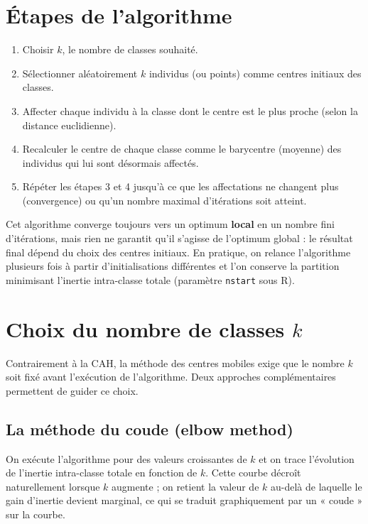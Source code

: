 \documentclass[11pt,a4paper]{report}
\begin{document}
	\section{Étapes de l'algorithme}
	
	\begin{enumerate}
		\item Choisir $k$, le nombre de classes souhaité.
		\item Sélectionner aléatoirement $k$ individus (ou points) comme centres initiaux des classes.
		\item Affecter chaque individu à la classe dont le centre est le plus proche (selon la distance euclidienne).
		\item Recalculer le centre de chaque classe comme le barycentre (moyenne) des individus qui lui sont désormais affectés.
		\item Répéter les étapes 3 et 4 jusqu'à ce que les affectations ne changent plus (convergence) ou qu'un nombre maximal d'itérations soit atteint.
	\end{enumerate}
	
	\begin{retenir}
		Cet algorithme converge toujours vers un optimum \textbf{local} en un nombre fini d'itérations, mais rien ne garantit qu'il s'agisse de l'optimum global : le résultat final dépend du choix des centres initiaux. En pratique, on relance l'algorithme plusieurs fois à partir d'initialisations différentes et l'on conserve la partition minimisant l'inertie intra-classe totale (paramètre \texttt{nstart} sous R).
	\end{retenir}
	
	\section{Choix du nombre de classes $k$}
	
	Contrairement à la CAH, la méthode des centres mobiles exige que le nombre $k$ soit fixé avant l'exécution de l'algorithme. Deux approches complémentaires permettent de guider ce choix.
	
	\subsection{La méthode du coude (elbow method)}
	On exécute l'algorithme pour des valeurs croissantes de $k$ et on trace l'évolution de l'inertie intra-classe totale en fonction de $k$. Cette courbe décroît naturellement lorsque $k$ augmente ; on retient la valeur de $k$ au-delà de laquelle le gain d'inertie devient marginal, ce qui se traduit graphiquement par un « coude » sur la courbe.
	
\end{document}
